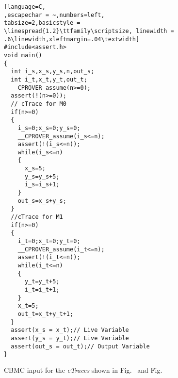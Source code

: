 \begin{figure}[!h]
\begin{center}
\begin{lstlisting}[language=C,
,escapechar = ~,numbers=left,
tabsize=2,basicstyle = \linespread{1.2}\ttfamily\scriptsize, linewidth = 
.6\linewidth,xleftmargin=.04\textwidth] 
#include<assert.h>
void main()
{
  int i_s,x_s,y_s,n,out_s;
  int i_t,x_t,y_t,out_t;
  __CPROVER_assume(n>=0);
  assert(!(n>=0));
  // cTrace for M0
  if(n>=0)
  {
    i_s=0;x_s=0;y_s=0;
    __CPROVER_assume(i_s<=n);
    assert(!(i_s<=n));
    while(i_s<=n)
    {
      x_s=5;
      y_s=y_s+5;
      i_s=i_s+1;
    }
    out_s=x_s+y_s;
  }
  //cTrace for M1
  if(n>=0)
  {
    i_t=0;x_t=0;y_t=0;
    __CPROVER_assume(i_t<=n);
    assert(!(i_t<=n));
    while(i_t<=n)
    {
      y_t=y_t+5;
      i_t=i_t+1;
    }
    x_t=5;
    out_t=x_t+y_t+1;
  }
  assert(x_s = x_t);// Live Variable
  assert(y_s = y_t);// Live Variable
  assert(out_s = out_t);// Output Variable
}
\end{lstlisting}
\end{center}
\caption{CBMC input for the \textit{cTraces} shown in Fig.~\protect{} and Fig.~\protect{}}	
\label{Fig:CBMCInput}
\end{figure}

